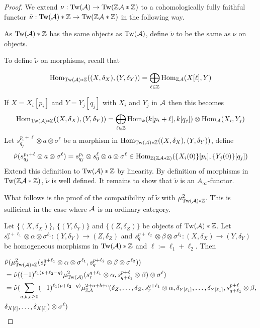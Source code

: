 \documentclass[12pt]{article}
\begin{document}
	\begin{proof}
		We extend $\nu: \textup{Tw}({\cal{A}}) \to \textup{Tw}(\mathbb{Z} {\cal{A}} * \mathbb{Z})$ to a cohomologically fully faithful functor $\tilde{\nu}: \textup{Tw}({\cal{A}})* \mathbb{Z} \to \textup{Tw}(\mathbb{Z} {\cal{A}} * \mathbb{Z})$ in the following way.
		
		\noindent As $\textup{Tw}({\cal{A}})* \mathbb{Z}$ has the same objects as $\textup{Tw}({\cal{A}})$, define $\tilde{\nu}$ to be the same as $\nu$ on objects. 
		
		\noindent To define $\tilde{\nu}$ on morphisms, recall that
		
		\[\textup{Hom}_{\textup{Tw}({\cal{A}}) * \mathbb{Z}}((X,\delta_X),(Y,\delta_Y)) = \bigoplus_{\ell \in \mathbb{Z}} \textup{Hom}_{\mathbb{Z} {\cal{A}}}(X[\ell],Y)\]
		
		If $X = X_i[p_i]$ and $Y = Y_j[q_j]$ with $X_i$ and $Y_j$ in  ${\cal{A}}$ then this becomes
		\[\textup{Hom}_{\textup{Tw}({\cal{A}}) * \mathbb{Z}}((X,\delta_X),(Y,\delta_Y)) = \bigoplus_{\ell \in \mathbb{Z}} \textup{Hom}_k (k[p_i+\ell],k[q_j]) \otimes \textup{Hom}_{\cal{A}}(X_i,Y_j)\]
		Let $s^{p_i+\ell}_{q_j} \otimes a \otimes \sigma^\ell$ be a morphism in $\textup{Hom}_{\textup{Tw}({\cal{A}}) * \mathbb{Z}}((X,\delta_X),(Y,\delta_Y))$, define
		\[\tilde{\nu}(s^{p_i+\ell}_{q_j} \otimes a \otimes \sigma^\ell) = s^{p_i}_{q_j} \otimes s^\ell_0 \otimes a \otimes \sigma^\ell \in \textup{Hom}_{\mathbb{Z}(\mathbb{Z} {\cal{A}} * \mathbb{Z})}(\{X_i(0)\}[p_i], \{Y_j(0)\}[q_j])\]
		Extend this definition to $\textup{Tw}({\cal{A}}) * \mathbb{Z}$ by linearity.
		By definition of morphisms in $\textup{Tw}(\mathbb{Z} {\cal{A}} * \mathbb{Z})$, $\tilde{\nu}$ is well defined. It remains to show that $\tilde{\nu}$ is an $A_\infty$-functor. 
		
		What follows is the proof of the compatibility of $\tilde{\nu}$ with $\mu_{\textup{Tw}({\cal{A}}) * \mathbb{Z}}^2$. This is sufficient in the case where ${\cal{A}}$ is an ordinary category.
		
		\noindent Let $\{(X,\delta_X)\}$, $\{(Y,\delta_Y)\}$ and $\{(Z,\delta_Z)\}$ be objects of $\textup{Tw}({\cal{A}}) * \mathbb{Z}$. Let $s^{q+\ell_1}_{r} \otimes \alpha \otimes \sigma^{\ell_1}: (Y,\delta_Y) \to (Z,\delta_Z)$ and $s^{p+\ell_2}_{q} \otimes \beta \otimes \sigma^{\ell_2}: (X,\delta_X) \to (Y,\delta_Y)$ be homogeneous morphisms in $\textup{Tw}({\cal{A}}) * \mathbb{Z}$ and $\ell:= \ell_1 + \ell_2$. Then
		
		\begin{align*}
			&\tilde{\nu}(\mu^2_{\textup{Tw}({\cal{A}}) * \mathbb{Z}}(s^{q+\ell_1}_{r} \otimes \alpha \otimes \sigma^{\ell_1},s^{p+\ell_2}_{q} \otimes \beta \otimes \sigma^{\ell_2})) \\
			&= \tilde{\nu}((-1)^{\ell_1 (p + \ell_2-q)} \mu^2_{\textup{Tw}({\cal{A}})}(s^{q+\ell_1}_{r} \otimes \alpha,s^{p+\ell}_{q+\ell_1} \otimes \beta ) \otimes \sigma^\ell) \\
			& = \tilde{\nu}(\displaystyle \sum_{a,b,c \geq 0} (-1)^{\ell_1 (p+\ell_2-q)} \mu^{2+a+b+c}_{\mathbb{Z} {\cal{A}}}(\delta_Z,\dots,\delta_Z, s^{q+\ell_1}_{r} \otimes\alpha, \delta_{Y[\ell_1]}, \dots, \delta_{Y[\ell_1]}, s^{p+\ell}_{q+\ell_1} \otimes \beta,\\
			& \delta_{X[\ell]}, \dots, \delta_{X[\ell]})\otimes \sigma^\ell)
		\end{align*}
		

\end{proof}
\end{document}
